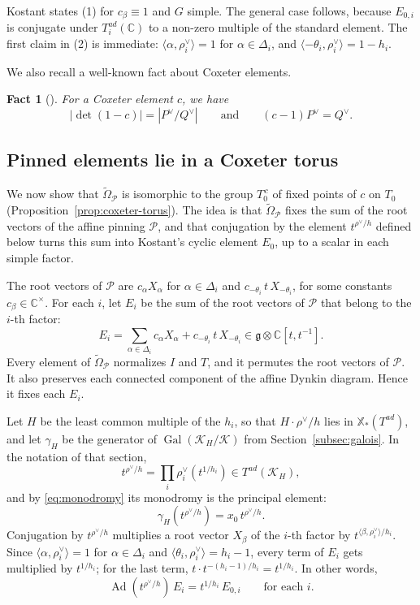\documentclass[psamsfonts]{amsart}
\theoremstyle{definition}
\theoremstyle{remark}
\numberwithin{equation}{section}
\newcommand{\X}{\mathbb{X}}
\newcommand{\tOm}{\widetilde{\Omega}}
\DeclareMathOperator{\Ad}{Ad}
\DeclareMathOperator{\Gal}{Gal}
\newcommand\cK{\mathcal{K}}
\newcommand\cP{\mathcal{P}}
\newcommand{\CC}{\mathbb{C}}
\numberwithin{equation}{section}
\newcommand{\fg}{\mathfrak{g}}
\theoremstyle{plain}
\newtheorem{fact}[thm]{Fact}
\begin{document}
Kostant states (1) for $c_\beta\equiv1$ and $G$ simple. The general case follows, because $E_{0,i}$ is conjugate under $T^{ad}_i(\CC)$ to a non-zero multiple of the standard element. The first claim in (2) is immediate: $\langle\alpha,\rho_i^\vee\rangle=1$ for $\alpha\in\Delta_i$, and $\langle-\theta_i,\rho_i^\vee\rangle=1-h_i$.

We also recall a well-known fact about Coxeter elements.

\begin{fact}[{\cite[Ch.~VI, \S1, Exercise~22]{Bou02}}]\label{fact:det}
For a Coxeter element $c$, we have
\[
|\det(1-c)|=|P^\vee/Q^\vee|\qquad\text{and}\qquad(c-1)P^\vee=Q^\vee.
\]
\end{fact}

\subsection{Pinned elements lie in a Coxeter torus}\label{subsec:coxeter-torus}
We now show that $\tOm_\cP$ is isomorphic to the group $T_0^{\,c}$ of fixed points of $c$ on $T_0$ (Proposition~\ref{prop:coxeter-torus}). The idea is that $\tOm_\cP$ fixes the sum of the root vectors of the affine pinning $\cP$, and that conjugation by the element $t^{\rho^\vee/h}$ defined below turns this sum into Kostant's cyclic element $E_0$, up to a scalar in each simple factor.

The root vectors of $\cP$ are $c_\alpha X_\alpha$ for $\alpha\in\Delta_i$ and $c_{-\theta_i}\,t\,X_{-\theta_i}$, for some constants $c_\beta\in\CC^\times$. For each $i$, let $E_i$ be the sum of the root vectors of $\cP$ that belong to the $i$-th factor:
\[
E_i=\sum_{\alpha\in\Delta_i}c_\alpha X_\alpha+c_{-\theta_i}\,t\,X_{-\theta_i}\in\fg\otimes\CC[t,t^{-1}].
\]
Every element of $\tOm_\cP$ normalizes $I$ and $T$, and it permutes the root vectors of $\cP$. It also preserves each connected component of the affine Dynkin diagram. Hence it fixes each $E_i$.

Let $H$ be the least common multiple of the $h_i$, so that $H\cdot\rho^\vee/h$ lies in $\X_*(T^{ad})$, and let $\gamma_H$ be the generator of $\Gal(\cK_H/\cK)$ from Section~\ref{subsec:galois}. In the notation of that section,
\[
t^{\rho^\vee/h}=\prod_i\rho_i^\vee(t^{1/h_i})\in T^{ad}(\cK_H),
\]
and by \eqref{eq:monodromy} its monodromy is the principal element:
\[
\gamma_H(t^{\rho^\vee/h})=x_0\,t^{\rho^\vee/h}.
\]
Conjugation by $t^{\rho^\vee/h}$ multiplies a root vector $X_\beta$ of the $i$-th factor by $t^{\langle\beta,\rho_i^\vee\rangle/h_i}$. Since $\langle\alpha,\rho_i^\vee\rangle=1$ for $\alpha\in\Delta_i$ and $\langle\theta_i,\rho_i^\vee\rangle=h_i-1$, every term of $E_i$ gets multiplied by $t^{1/h_i}$; for the last term, $t\cdot t^{-(h_i-1)/h_i}=t^{1/h_i}$. In other words,
\begin{equation}\label{eq:E}
\Ad(t^{\rho^\vee/h})\,E_i=t^{1/h_i}\,E_{0,i}\qquad\text{for each }i.
\end{equation}
\end{document}
